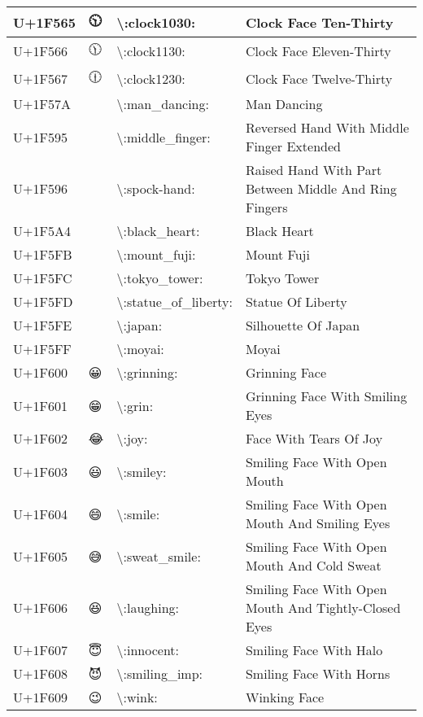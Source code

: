 \begin{table}[h]
\begin{tabulary}{\linewidth}{|L|L|L|L|}
\hline
U+1F565 & 🕥 & {\textbackslash}:clock1030: & Clock Face Ten-Thirty \\
\hline
U+1F566 & 🕦 & {\textbackslash}:clock1130: & Clock Face Eleven-Thirty \\
\hline
U+1F567 & 🕧 & {\textbackslash}:clock1230: & Clock Face Twelve-Thirty \\
\hline
U+1F57A & 🕺 & {\textbackslash}:man\_dancing: & Man Dancing \\
\hline
U+1F595 & 🖕 & {\textbackslash}:middle\_finger: & Reversed Hand With Middle Finger Extended \\
\hline
U+1F596 & 🖖 & {\textbackslash}:spock-hand: & Raised Hand With Part Between Middle And Ring Fingers \\
\hline
U+1F5A4 & 🖤 & {\textbackslash}:black\_heart: & Black Heart \\
\hline
U+1F5FB & 🗻 & {\textbackslash}:mount\_fuji: & Mount Fuji \\
\hline
U+1F5FC & 🗼 & {\textbackslash}:tokyo\_tower: & Tokyo Tower \\
\hline
U+1F5FD & 🗽 & {\textbackslash}:statue\_of\_liberty: & Statue Of Liberty \\
\hline
U+1F5FE & 🗾 & {\textbackslash}:japan: & Silhouette Of Japan \\
\hline
U+1F5FF & 🗿 & {\textbackslash}:moyai: & Moyai \\
\hline
U+1F600 & 😀 & {\textbackslash}:grinning: & Grinning Face \\
\hline
U+1F601 & 😁 & {\textbackslash}:grin: & Grinning Face With Smiling Eyes \\
\hline
U+1F602 & 😂 & {\textbackslash}:joy: & Face With Tears Of Joy \\
\hline
U+1F603 & 😃 & {\textbackslash}:smiley: & Smiling Face With Open Mouth \\
\hline
U+1F604 & 😄 & {\textbackslash}:smile: & Smiling Face With Open Mouth And Smiling Eyes \\
\hline
U+1F605 & 😅 & {\textbackslash}:sweat\_smile: & Smiling Face With Open Mouth And Cold Sweat \\
\hline
U+1F606 & 😆 & {\textbackslash}:laughing: & Smiling Face With Open Mouth And Tightly-Closed Eyes \\
\hline
U+1F607 & 😇 & {\textbackslash}:innocent: & Smiling Face With Halo \\
\hline
U+1F608 & 😈 & {\textbackslash}:smiling\_imp: & Smiling Face With Horns \\
\hline
U+1F609 & 😉 & {\textbackslash}:wink: & Winking Face \\

\end{tabulary}
\end{table}
